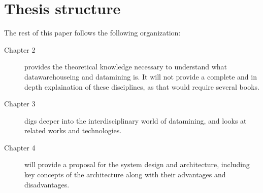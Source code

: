 \section{Thesis structure}
	The rest of this paper follows the following organization: 
	
		\begin{description}
			\item[Chapter 2] provides the theoretical knowledge necessary to understand what datawarehouseing and datamining is. 
				It will not provide a complete and in depth explaination of these disciplines, as that would require several books.
			\item[Chapter 3] digs deeper into the interdisciplinary world of datamining, and looks at related works and technologies.
			\item[Chapter 4] will provide a proposal for the system design and architecture, 
				including key concepts of the architecture along with their advantages and disadvantages.
				
		\end{description}